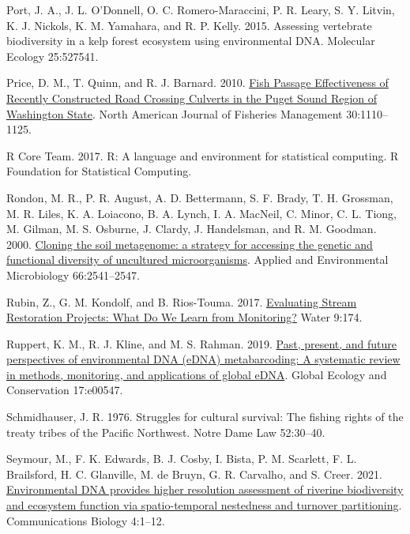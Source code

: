 \documentclass[
]{article}
\newlength{\cslhangindent}
\newlength{\cslentryspacingunit} %
\newenvironment{CSLReferences}[2] %
 {%
  \setlength{\parindent}{0pt}
  \ifodd #1
  \let\oldpar\par
  \def\par{\hangindent=\cslhangindent\oldpar}
  \fi
  \setlength{\parskip}{#2\cslentryspacingunit}
 }%
 {}
\begin{document}
\begin{CSLReferences}{1}{0}
\leavevmode{}%
Port, J. A., J. L. O'Donnell, O. C. Romero-Maraccini, P. R. Leary, S. Y.
Litvin, K. J. Nickols, K. M. Yamahara, and R. P. Kelly. 2015. Assessing
vertebrate biodiversity in a kelp forest ecosystem using environmental
DNA. Molecular Ecology 25:527541.

\leavevmode{}%
Price, D. M., T. Quinn, and R. J. Barnard. 2010.
\href{https://doi.org/10.1577/M10-004.1}{Fish Passage Effectiveness of
Recently Constructed Road Crossing Culverts in the Puget Sound Region of
Washington State}. North American Journal of Fisheries Management
30:1110--1125.

\leavevmode{}%
R Core Team. 2017. R: A language and environment for statistical
computing. R Foundation for Statistical Computing.

\leavevmode{}%
Rondon, M. R., P. R. August, A. D. Bettermann, S. F. Brady, T. H.
Grossman, M. R. Liles, K. A. Loiacono, B. A. Lynch, I. A. MacNeil, C.
Minor, C. L. Tiong, M. Gilman, M. S. Osburne, J. Clardy, J. Handelsman,
and R. M. Goodman. 2000.
\href{https://doi.org/10.1128/AEM.66.6.2541-2547.2000}{Cloning the soil
metagenome: a strategy for accessing the genetic and functional
diversity of uncultured microorganisms}. Applied and Environmental
Microbiology 66:2541--2547.

\leavevmode{}%
Rubin, Z., G. M. Kondolf, and B. Rios-Touma. 2017.
\href{https://doi.org/10.3390/w9030174}{Evaluating Stream Restoration
Projects: What Do We Learn from Monitoring?} Water 9:174.

\leavevmode{}%
Ruppert, K. M., R. J. Kline, and M. S. Rahman. 2019.
\href{https://doi.org/10.1016/j.gecco.2019.e00547}{Past, present, and
future perspectives of environmental DNA (eDNA) metabarcoding: A
systematic review in methods, monitoring, and applications of global
eDNA}. Global Ecology and Conservation 17:e00547.

\leavevmode{}%
Schmidhauser, J. R. 1976. Struggles for cultural survival: The fishing
rights of the treaty tribes of the Pacific Northwest. Notre Dame Law
52:30--40.

\leavevmode{}%
Seymour, M., F. K. Edwards, B. J. Cosby, I. Bista, P. M. Scarlett, F. L.
Brailsford, H. C. Glanville, M. de Bruyn, G. R. Carvalho, and S. Creer.
2021. \href{https://doi.org/10.1038/s42003-021-02031-2}{Environmental
DNA provides higher resolution assessment of riverine biodiversity and
ecosystem function via spatio-temporal nestedness and turnover
partitioning}. Communications Biology 4:1--12.


\end{CSLReferences}
\end{document}
